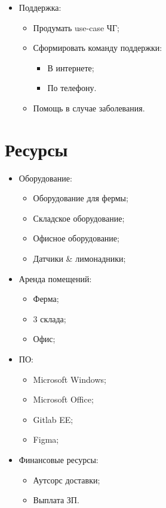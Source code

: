 \documentclass[a4paper,8pt]{article}
\begin{document}
\begin{itemize}
        \item Поддержка:
            \begin{itemize}
                \item Продумать use-case ЧГ;
                \item Сформировать команду поддержки:
                    \begin{itemize}
                        \item В интернете;
                        \item По телефону.
                    \end{itemize}
                \item Помощь в случае заболевания.
            \end{itemize}
    \end{itemize}


\section*{Ресурсы}


    \begin{itemize}
        \item Оборудование:
            \begin{itemize}
                \item Оборудование для фермы;
                \item Складское оборудование;
                \item Офисное оборудование;
                \item Датчики \& лимонадники;
            \end{itemize}

        \item Аренда помещений:
            \begin{itemize}
                \item Ферма;
                \item 3 склада;
                \item Офис;
            \end{itemize}

        \item ПО:
            \begin{itemize}
                \item Microsoft Windows;
                \item Microsoft Office;
                \item Gitlab EE;
                \item Figma;
            \end{itemize}

        \item Финансовые ресурсы:
            \begin{itemize}
                \item Аутсорс доставки;
                \item Выплата ЗП.
            \end{itemize}

    \end{itemize}
\end{document}

